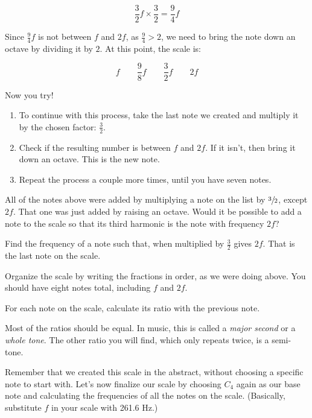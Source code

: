 \documentclass[12pt,noauthor,nooutcomes,hints,instructornotes]{ximera}%
\begin{document}
\[
\frac{3}{2}f\times\frac{3}{2}=\frac{9}{4}f
\]

Since $\frac{9}{4}f$ is not between $f$ and $2f$, as $\frac{9}{4}>2$, we need to bring the note down an octave by dividing it by $2$.  At this point, the scale is:

\[ f \qquad \frac{9}{8}f \qquad \frac{3}{2}f \qquad 2f
\]




\begin{question} Now you try! 
\begin{enumerate}
\item To continue with this process, take the last note we created and multiply it by the chosen factor: $\frac{3}{2}$.
    \item Check if the resulting number is between $f$ and $2f$. If it isn't, then bring it down an octave. This is the new note.
    \item Repeat the process a couple more times, until you have seven notes.
    \end{enumerate}
\end{question}    
    
 \begin{question}   All of the notes above were added by multiplying a note on the list by $\sfrac{3}{2}$, except $2f$. That one was just added by raising an octave. Would it be possible to add a note to the scale so that its third harmonic is the note with frequency $2f$?
    
 Find the frequency of a note such that, when multiplied by $\frac{3}{2}$ gives $2f$. That is the last note on the scale. 
\end{question}     
\begin{question}Organize the scale by writing the fractions in order, as we were doing above. You should have eight notes total, including $f$ and $2f$.
\end{question} 
    
\begin{question} For each note on the scale, calculate its ratio with the previous note. 
    \begin{hint} Most of the ratios should be equal. In music, this is called a \textit{major second} or a \textit{whole tone}. The other ratio you will find, which only repeats twice, is a semi-tone.   \end{hint}
\end{question}     
    
\begin{question}Remember that we created this scale in the abstract, without choosing a specific note to start with. Let's now finalize our scale by choosing $C_4$ again as our base note and calculating the frequencies of all the notes on the scale. (Basically, substitute $f$ in your scale with 261.6 Hz.)\end{question} 
    
\end{document}
